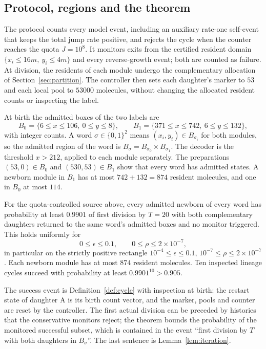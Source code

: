 \subsection{Protocol, regions and the theorem}\label{sec:protocol}
The protocol counts every model event, including an auxiliary rate-one self-event that keeps the total jump rate positive, and rejects the cycle when the counter reaches the quota $J=10^8$. It monitors exits from the certified resident domain $\{x_i\le16m,\ y_i\le4m\}$ and every reverse-growth event; both are counted as failure. At division, the residents of each module undergo the complementary allocation of Section~\ref{sec:partition}. The controller then sets each daughter's marker to $53$ and each local pool to $53000$ molecules, without changing the allocated resident counts or inspecting the label.

At birth the admitted boxes of the two labels are
\begin{equation}\label{eq:boxes}
 B_0=\{6\le x\le106,\ 0\le y\le8\},\qquad B_1=\{371\le x\le742,\ 6\le y\le132\},
\end{equation}
with integer counts. A word $\sigma\in\{0,1\}^2$ means $(x_i,y_i)\in B_{\sigma_i}$ for both modules, so the admitted region of the word is $B_\sigma=B_{\sigma_0}\times B_{\sigma_1}$. The decoder is the threshold $x>212$, applied to each module separately. The preparations $(53,0)\in B_0$ and $(530,53)\in B_1$ show that every word has admitted states. A newborn module in $B_1$ has at most $742+132=874$ resident molecules, and one in $B_0$ at most $114$.

\begin{theorem}\label{thm:constructed}
For the quota-controlled source above, every admitted newborn of every word has probability at least $0.9901$ of first division by $T=20$ with both complementary daughters returned to the same word's admitted boxes and no monitor triggered. This holds uniformly for
\[
 0\le\epsilon\le0.1,\qquad0\le\rho\le2\times10^{-7},
\]
in particular on the strictly positive rectangle $10^{-4}\le\epsilon\le0.1$, $10^{-7}\le\rho\le2\times10^{-7}$. Each newborn module has at most $874$ resident molecules. Ten inspected lineage cycles succeed with probability at least $0.9901^{10}>0.905$.
\end{theorem}

The success event is Definition~\ref{def:cycle} with inspection at birth: the restart state of daughter A is its birth count vector, and the marker, pools and counter are reset by the controller. The first actual division can be preceded by histories that the conservative monitors reject; the theorem bounds the probability of the monitored successful subset, which is contained in the event ``first division by $T$ with both daughters in $B_\sigma$''. The last sentence is Lemma~\ref{lem:iteration}.

